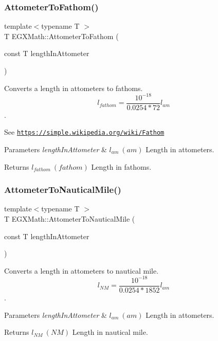 \subsubsection{\texorpdfstring{Attometer\+To\+Fathom()}{AttometerToFathom()}}
{\footnotesize\ttfamily template$<$typename T $>$ \\
T E\+G\+X\+Math\+::\+Attometer\+To\+Fathom (\begin{DoxyParamCaption}\item[{const T}]{length\+In\+Attometer }\end{DoxyParamCaption})}



Converts a length in attometers to fathoms. \[ l_{fathom}= \frac{10^{-18}}{0.0254 * 72} l_{am} \]. 

See \href{https://simple.wikipedia.org/wiki/Fathom}{\tt https\+://simple.\+wikipedia.\+org/wiki/\+Fathom} 
\begin{DoxyParams}{Parameters}
{\em length\+In\+Attometer} & $ l_{am}\ (am)$ Length in attometers. \\
\hline
\end{DoxyParams}
\begin{DoxyReturn}{Returns}
$ l_{fathom}\ (fathom)$ Length in fathoms. 
\end{DoxyReturn}
\mbox{\label{group___e_g_x_math-_conversions-_length_conversions-_s_i-_attometer-_nautical_ga38f0b72d347141e8740bcf9d84a08d25}} 
\subsubsection{\texorpdfstring{Attometer\+To\+Nautical\+Mile()}{AttometerToNauticalMile()}}
{\footnotesize\ttfamily template$<$typename T $>$ \\
T E\+G\+X\+Math\+::\+Attometer\+To\+Nautical\+Mile (\begin{DoxyParamCaption}\item[{const T}]{length\+In\+Attometer }\end{DoxyParamCaption})}



Converts a length in attometers to nautical mile. \[ l_{NM}= \frac{10^{-18}}{0.0254 * 1852} l_{am} \]. 


\begin{DoxyParams}{Parameters}
{\em length\+In\+Attometer} & $ l_{am}\ (am)$ Length in attometers. \\
\hline
\end{DoxyParams}
\begin{DoxyReturn}{Returns}
$ l_{NM}\ (NM)$ Length in nautical mile. 
\end{DoxyReturn}
